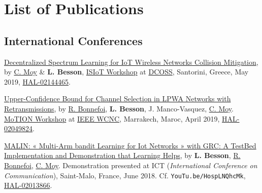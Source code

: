 \chapter*{List of Publications}




\section*{International Conferences}
\renewcommand{\labelenumi}{[IC-\arabic{enumi}]}
\begin{etaremune}
\item
  \href{https://hal.inria.fr/hal-02144465/document}{Decentralized Spectrum Learning for IoT Wireless Networks Collision Mitigation}, by \href{https://moychris.wordpress.com/}{C. Moy} \& \textbf{L. Besson},
  \href{https://sites.google.com/view/ISIoT2019/}{ISIoT Workshop} at \href{https://dcoss.org/}{DCOSS}, Santorini, Greece, May 2019,
  \href{https://hal.inria.fr/hal-02144465}{HAL-02144465}.
  \cite{MoyBesson2019}
\item
  \href{https://perso.crans.org/besson/articles/BMBBM__IEEE_WCNC__2019.pdf}{Upper-Confidence
  Bound for Channel Selection in LPWA Networks with Retransmissions},
  by \href{https://remibonnefoi.wordpress.com/}{R. Bonnefoi}, \textbf{L. Besson}, J.
  Manco-Vasquez,
  \href{https://moychris.wordpress.com/}{C. Moy}.
  \href{https://sites.google.com/view/wcncworkshop-motion2019/}{MoTION Workshop} at
  \href{http://wcnc2019.ieee-wcnc.org/}{IEEE WCNC},
  Marrakech, Maroc, April 2019, \href{https://hal.inria.fr/hal-02049824}{HAL-02049824}.
  \cite{Bonnefoi2019WCNC}
\item
  \href{https://perso.crans.org/besson/articles/BBM__Demo_ICT_2018.pdf}{MALIN:
  « Multi-Arm bandit Learning for Iot Networks » with GRC: A TestBed
  Implementation and Demonstration that Learning Helps}, by \textbf{L.
  Besson}, \href{https://remibonnefoi.wordpress.com/}{R. Bonnefoi},
  \href{https://moychris.wordpress.com/}{C. Moy}. Demonstration
  presented at ICT (\emph{International Conference on Communication}),
  Saint-Malo, France, June 2018. Cf. \texttt{YouTu.be/HospLNQhcMk}, \href{https://hal.inria.fr/hal-02013866}{HAL-02013866}.
  \cite{Besson2018ICT}
\end{etaremune}


